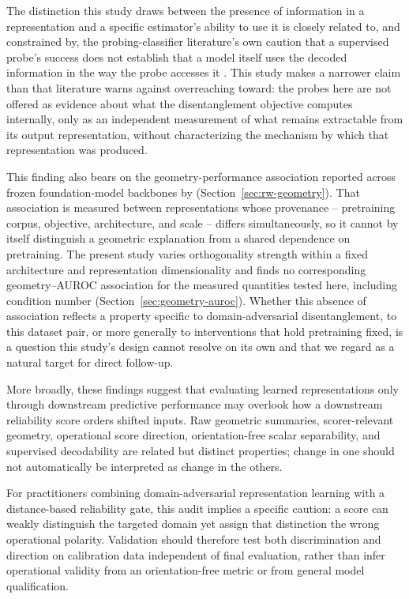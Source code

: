 The distinction this study draws between the presence of information in a representation and a specific estimator's ability to use it is closely related to, and constrained by, the probing-classifier literature's own caution that a supervised probe's success does not establish that a model itself uses the decoded information in the way the probe accesses it \citep{hewitt2019designing, belinkov2022probing}. This study makes a narrower claim than that literature warns against overreaching toward: the probes here are not offered as evidence about what the disentanglement objective computes internally, only as an independent measurement of what remains extractable from its output representation, without characterizing the mechanism by which that representation was produced.

This finding also bears on the geometry-performance association reported across frozen foundation-model backbones by \citet{janiak2026geometry} (Section~\ref{sec:rw-geometry}). That association is measured between representations whose provenance -- pretraining corpus, objective, architecture, and scale -- differs simultaneously, so it cannot by itself distinguish a geometric explanation from a shared dependence on pretraining. The present study varies orthogonality strength within a fixed architecture and representation dimensionality and finds no corresponding geometry--AUROC association for the measured quantities tested here, including condition number (Section~\ref{sec:geometry-auroc}). Whether this absence of association reflects a property specific to domain-adversarial disentanglement, to this dataset pair, or more generally to interventions that hold pretraining fixed, is a question this study's design cannot resolve on its own and that we regard as a natural target for direct follow-up.

More broadly, these findings suggest that evaluating learned representations only through downstream predictive performance may overlook how a downstream reliability score orders shifted inputs. Raw geometric summaries, scorer-relevant geometry, operational score direction, orientation-free scalar separability, and supervised decodability are related but distinct properties; change in one should not automatically be interpreted as change in the others.

For practitioners combining domain-adversarial representation learning with a distance-based reliability gate, this audit implies a specific caution: a score can weakly distinguish the targeted domain yet assign that distinction the wrong operational polarity. Validation should therefore test both discrimination and direction on calibration data independent of final evaluation, rather than infer operational validity from an orientation-free metric or from general model qualification.
